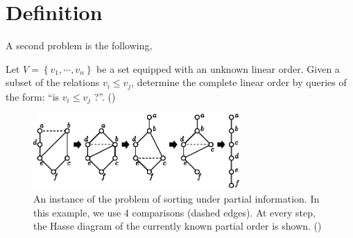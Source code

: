 
\section{Definition}

A second problem is the following,

Let $V = \left\{{v_1 , \cdots , v_n }\right\}$ be a set equipped with an unknown linear order. Given a subset of the relations $v_i \leq v_j$, determine the complete linear order by queries of the form: ``is $v_i \leq v_j$ ?''. (\cite{cardinal2013sorting})


\begin{figure}
	\centering
	\includegraphics[width=0.7\textwidth]{fig/supi/ex1}
	\caption{\label{fig:supi/ex1} An instance of the problem of sorting under partial information. In this example, we use 4 comparisons (dashed edges). At every step, the Hasse diagram of the currently known partial order is shown. (\cite{cardinal2013sorting})}
\end{figure}
